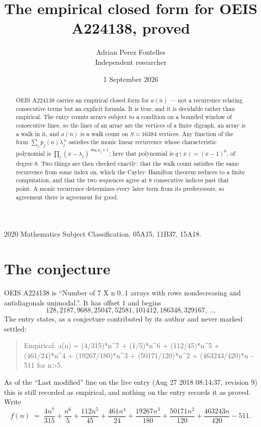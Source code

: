 \documentclass[11pt,a4paper]{article}
\title{The empirical closed form for OEIS A224138, proved}
\author{Adrian Perez Fontelles\\ \small Independent researcher}
\date{1 September 2026}
\theoremstyle{plain}
\theoremstyle{definition}
\begin{document}
\maketitle

\begin{abstract}
OEIS A224138 carries an empirical closed form for $a(n)$ --- not a recurrence relating
consecutive terms but an explicit formula. It is true, and it is decidable rather than
empirical. The entry counts arrays subject to a condition on a bounded window of consecutive lines, so the lines of an array are the
vertices of a finite digraph, an array is a walk in it, and $a(n)$ is a walk count on
$S=16384$ vertices. Any function of the form $\sum_j p_j(n)\lambda_j^{\,n}$ satisfies the
monic linear recurrence whose characteristic polynomial is
$\prod_j(x-\lambda_j)^{\deg p_j+1}$; here that polynomial is $q(x)=(x-1)^{8}$, of degree
$8$. Two things are then checked exactly: that the walk count satisfies the same
recurrence from some index on, which the Cayley--Hamilton theorem reduces to a finite
computation, and that the two sequences agree at $8$ consecutive indices past that
point. A monic recurrence determines every later term from its predecessors, so agreement
there is agreement for good.
\end{abstract}

\noindent\small 2020 Mathematics Subject Classification. 05A15, 11B37, 15A18.\normalsize

\section{The conjecture}

OEIS A224138 is ``Number of 7 X n 0..1 arrays with rows nondecreasing and antidiagonals unimodal.''. It has offset $1$ and begins
\[
128, 2187, 9688, 25047, 52581, 101412, 186348, 329167,\ \dots
\]
The entry states, as a conjecture contributed by its author and never marked settled:
\begin{quote}
Empirical: a(n) = (4/315)*n\^{}7 + (1/5)*n\^{}6 + (112/45)*n\^{}5 + (461/24)*n\^{}4 + (19267/180)*n\^{}3 + (50171/120)*n\^{}2 + (463243/420)*n - 511 for n>5.
\end{quote}
As of the ``Last modified'' line on the live entry (Aug 27 2018 08:14:37, revision 9) this is still
recorded as empirical, and nothing on the entry records it as proved. Write
\[
f(n)\;=\;\frac{4 n^{7}}{315} + \frac{n^{6}}{5} + \frac{112 n^{5}}{45} + \frac{461 n^{4}}{24} + \frac{19267 n^{3}}{180} + \frac{50171 n^{2}}{120} + \frac{463243 n}{420} - 511.
\]
\end{document}
